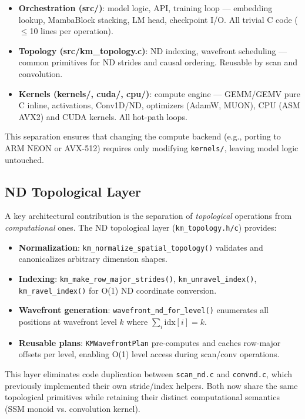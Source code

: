 \documentclass[10pt,onecolumn]{article}
\begin{document}
\begin{itemize}
  \item \textbf{Orchestration (src/)}: model logic, API, training loop —
        embedding lookup, MambaBlock stacking, LM head,
        checkpoint I/O. All trivial C code ($\leq$10 lines per operation).
  \item \textbf{Topology (src/km\_topology.c)}: ND indexing, wavefront scheduling —
        common primitives for ND strides and causal ordering. Reusable by scan and convolution.
  \item \textbf{Kernels (kernels/, cuda/, cpu/)}: compute engine —
        GEMM/GEMV pure C inline, activations, Conv1D/ND, optimizers (AdamW, MUON),
        CPU (ASM AVX2) and CUDA kernels. All hot-path loops.
\end{itemize}

This separation ensures that changing the compute backend
(e.g., porting to ARM NEON or AVX-512) requires only modifying
\texttt{kernels/}, leaving model logic untouched.

\subsection{ND Topological Layer}

A key architectural contribution is the separation of \emph{topological} operations from \emph{computational} ones. The ND topological layer (\texttt{km\_topology.h/c}) provides:

\begin{itemize}
  \item \textbf{Normalization}: \texttt{km\_normalize\_spatial\_topology()} validates and canonicalizes arbitrary dimension shapes.
  \item \textbf{Indexing}: \texttt{km\_make\_row\_major\_strides()}, \texttt{km\_unravel\_index()}, \texttt{km\_ravel\_index()} for O(1) ND coordinate conversion.
  \item \textbf{Wavefront generation}: \texttt{wavefront\_nd\_for\_level()} enumerates all positions at wavefront level $k$ where $\sum_i \text{idx}[i] = k$.
  \item \textbf{Reusable plans}: \texttt{KMWavefrontPlan} pre-computes and caches row-major offsets per level, enabling O(1) level access during scan/conv operations.
\end{itemize}

This layer eliminates code duplication between \texttt{scan\_nd.c} and \texttt{convnd.c}, which previously implemented their own stride/index helpers. Both now share the same topological primitives while retaining their distinct computational semantics (SSM monoid vs.
convolution kernel).
\end{document}
